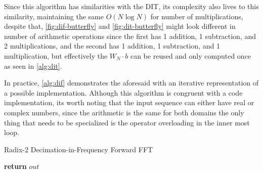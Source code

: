 \documentclass[
  oneside,
  11pt, a4paper,
  footinclude=true,
  headinclude=true,
  cleardoublepage=empty
]{scrbook}
\begin{document}
Since this algorithm has similarities with the DIT, its complexity also lives to this similarity, maintaining the same \(O(N \log{N})\) for number of multiplications, despite that, \autoref{fig:dif-butterfly} and \autoref{fig:dit-butterfly} might look different in number of arithmetic operations since the first has 1 addition, 1 subtraction, and 2 multiplications, and the second has 1 addition, 1 subtraction, and 1 multiplication, but effectively the \(W_{N} \cdot b\) can be reused and only computed once as seen in \autoref{alg:dit}.


In practice, \autoref{alg:dif} demonstrates the aforesaid with an iterative representation of a possible implementation. Although this algorithm is congruent with a code implementation, its worth noting that the input sequence can either have real or complex numbers, since the arithmetic is the same for both domains the only thing that needs to be specialized is the operator overloading in the inner most loop.

\begin{algorithm}[H]
    \caption{Radix-2 Decimation-in-Frequency Forward FFT} \label{alg:dif}

    

    \textbf{return} $out$\;
\end{algorithm}
\end{document}
